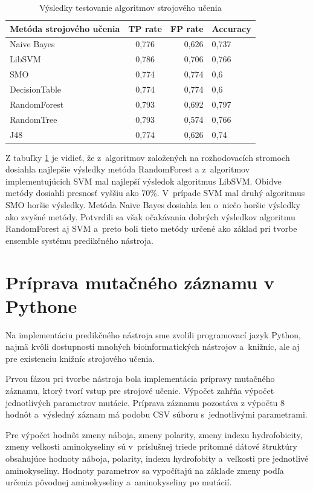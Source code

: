 \begin{table}[H]
	\centering
	\begin{tabular}{ | l | c | r | l| }
		\hline 
		Metóda strojového učenia & TP rate & FP rate & Accuracy \\ \hline
		Naive Bayes & 0,776 & 0,626 & 0,737 \\ \hline
		LibSVM &  0,786   & 0,706   & 0,766  \\ \hline
		SMO & 0,774 & 0,774 & 0,6\\ \hline
		DecisionTable & 0,774 & 0,774 & 0,6\\ \hline
		RandomForest & 0,793 & 0,692 & 0,797\\ \hline
		RandomTree & 0,793 & 0,574 & 0,766\\ \hline
		J48 & 0,774 & 0,626 & 0,74\\ \hline		
	\end{tabular}
	\caption {Výsledky testovanie algoritmov strojového učenia} \label{testovanie} 
\end{table}

Z tabuľky \ref{testovanie} je vidieť, že z~algoritmov založených na rozhodovacích stromoch dosiahla najlepšie výsledky metóda RandomForest a z~algoritmov implementujúcich SVM mal najlepší výsledok algoritmus LibSVM. Obidve metódy dosiahli presnosť vyššiu ako 70\%. V~prípade SVM mal druhý algoritmus SMO horšie výsledky. Metóda Naive Bayes dosiahla len o~niečo horšie výsledky ako zvyšné metódy. Potvrdili sa však očakávania dobrých výsledkov algoritmu RandomForest aj SVM a~preto boli tieto metódy určené ako základ pri tvorbe ensemble systému predikčného nástroja.

\section{Príprava mutačného záznamu v Pythone}

Na implementáciu predikčného nástroja sme zvolili programovací jazyk Python, najmä kvôli dostupnosti mnohých bioinformatických nástrojov a~knižníc, ale aj pre existenciu knižníc strojového učenia.

Prvou fázou pri tvorbe nástroja bola implementácia prípravy mutačného záznamu, ktorý tvorí vstup pre strojové učenie. Výpočet zahŕňa výpočet jednotlivých parametrov mutácie. Príprava záznamu pozostáva z výpočtu 8 hodnôt a~výsledný záznam má podobu CSV súboru s~jednotlivými parametrami.

Pre výpočet hodnôt zmeny náboja, zmeny polarity, zmeny indexu hydrofobicity, zmeny veľkosti aminokyseliny sú v~príslušnej triede prítomné dátové štruktúry obsahujúce hodnoty náboja, polarity, indexu hydrofobity a~veľkosti pre jednotlivé aminokyseliny. Hodnoty parametrov sa vypočítajú na základe zmeny podľa určenia pôvodnej aminokyseliny a~aminokyseliny po mutácií.

